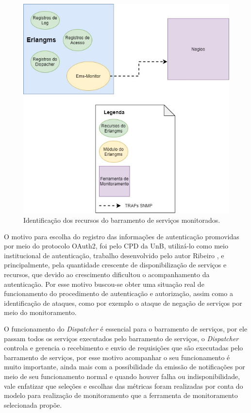 \begin{figure}[H]
	\begin{center}
	\includegraphics[scale = 0.70]{img/Monitoramento_Recusos_Barramento.jpg}
	\caption{Identificação dos recursos do barramento de serviços monitorados.}
	\label{fun:fig:ResourcesEMS-monitoring}
	\end{center}
\end{figure}


O motivo para escolha do registro das informações de autenticação promovidas por meio do protocolo OAuth2, foi pelo \acrshort{CPD} da \acrshort{UnB}, utilizá-lo como meio institucional de autenticação, trabalho desenvolvido pelo autor Ribeiro \cite{ribeiro2017implementaccao}, e principalmente, pela quantidade crescente de disponibilização de serviços e recursos, que devido ao crescimento dificultou o acompanhamento da autenticação. Por esse motivo buscou-se obter uma situação real de funcionamento do procedimento de autenticação e autorização, assim como a identificação de ataques, como por exemplo o ataque de negação de serviços por meio do monitoramento. 

O funcionamento do \textit{Dispatcher} é essencial para o barramento de serviços, por ele passam todos os serviços executados pelo barramento de serviços, o \textit{Dispatcher} controla e gerencia o recebimento e envio de requisições que são executadas pelo barramento de serviços, por esse motivo acompanhar o seu funcionamento é muito importante, ainda mais com a possibilidade da emissão de notificações por meio de seu funcionamento normal e quando houver falha ou indisponibilidade, vale enfatizar que seleções e escolhas das métricas foram realizadas por conta do modelo para realização de monitoramento que a ferramenta de monitoramento selecionada propõe.   

